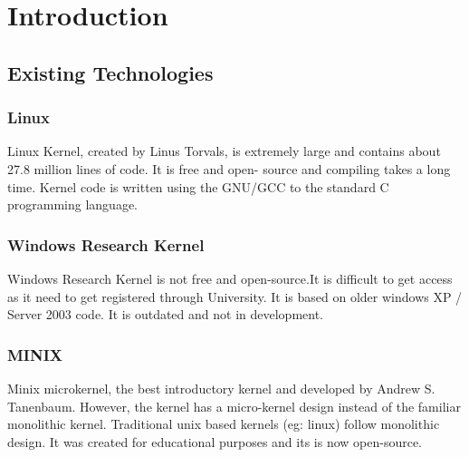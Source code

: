 
\chapter{Introduction}\label{chapter:Introduction}



\newpage
\section{Existing Technologies}\label{section:Existing Technologies}
\subsection{Linux}
Linux Kernel, created by Linus Torvals, is extremely large and contains about 27.8 million lines of code. It is free and open- source and compiling takes a long time. Kernel code is written using the GNU/GCC to the standard C programming language. 

\subsection{Windows Research Kernel}
Windows Research Kernel is not free and open-source.It is difficult to get access as it need to get registered through University. It is based on older windows XP / Server 2003 code. It is outdated and not in development.  

\subsection{MINIX}
Minix microkernel, the best introductory kernel and developed by Andrew S. Tanenbaum. However, the kernel has a micro-kernel design instead of the familiar monolithic kernel. Traditional unix based kernels (eg: linux) follow monolithic design. It was created for educational purposes and its is now open-source.

